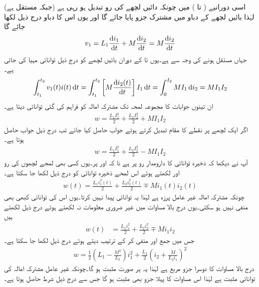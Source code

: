 اسی دورانیے ( تا )  میں چونکہ دائیں لچھے کی رو تبدیل ہو رہی ہے (جبکہ  مستقل ہے) لہٰذا بائیں لچھے کے دباو میں مشترک جزو پایا جائے گا اور یوں اس کا دباو درج ذیل لکھا جائے گا
\begin{align*}
v_1=L_1 \frac{\dif i_1}{\dif t}+M \frac{\dif i_2}{\dif t}=M\frac{\dif i_2}{\dif t}
\end{align*}
جہاں  مستقل ہونے کی وجہ سے  ہے۔یوں  تا  کے دوران بائیں لچھے کو درج ذیل توانائی مہیا کی جاتی ہے۔
\begin{align*}
\int_{t_1}^{t_2} v_1(t) i(t)\dif t=\int_{t_1}^{t_2} \left[M \frac{\dif i_2(t)}{\dif t}\right] I_1 \dif t=\int_{0}^{I_2} M I_1 \dif i_2=M I_1 I_2
\end{align*}
ان تینوں جوابات کا مجموعہ لمحہ  تک مشترکہ امالہ کو فراہم کی گئی توانائی دیتا ہے۔
\begin{align}\label{مساوات_مقناطیسی_توانائی_مشترکہ_امالہ_الف}
w=\frac{L_1 I_1^2}{2}+\frac{L_2 I_2^2}{2}+MI_1 I_2
\end{align}
اگر ایک لچھے پر نقطے کا مقام تبدیل کرتے ہوئے جواب حاصل کیا جائے تب درج ذیل جواب حاصل ہوتا ہے۔
\begin{align}\label{مساوات_مقناطیسی_توانائی_مشترکہ_امالہ_ب}
w=\frac{L_1 I_1^2}{2}+\frac{L_2 I_2^2}{2}-MI_1 I_2
\end{align}
آپ نے دیکھا کہ ذخیرہ توانائی کا دارومدار رو پر ہے نا کہ  اور  پر۔یوں کسی بھی لمحے لچھوں کی رو  اور  لکھتے ہوئے اس لمحے ذخیرہ توانائی کو درج ذیل لکھا جا سکتا ہے۔
\begin{align}\label{مساوات_مقناطیسی_توانائی_مشترکہ_امالہ_پ}
w(t)=\frac{L_1 i^2_1(t)}{2}+\frac{L_2 i^2_2(t)}{2}\mp M i_1(t) i_2(t)
\end{align}
چونکہ مشترکہ امالہ غیر عامل پرزہ ہے لہٰذا یہ توانائی پیدا نہیں کرتا۔یوں اس کی توانائی کبھی بھی منفی نہیں ہو سکتی۔یوں درج بالا مساوات میں غیر ضروری معلومات نہ لکھتے ہوئے درج ذیل لکھتے ہیں
\begin{align}
w(t)&=\frac{L_1 i^2_1}{2}+\frac{L_2 i^2_2}{2}\mp M i_1 i_2
\end{align}
جس میں  جمع اور منفی کر کے ترتیب دیتے ہوئے درج ذیل لکھا جا سکتا ہے۔
\begin{align}
w=\frac{1}{2} \left(L_1-\frac{M^2}{L_2}\right)i^2_1+\frac{L_2}{2}\left(i_2+\frac{M}{L_2 i_1}\right)^2
\end{align}
درج بالا مساوات کا دوسرا جزو مربع ہے لہٰذا یہ ہر صورت مثبت ہو گا۔چونکہ غیر عامل مشترکہ امالہ کی توانائی مثبت ہے لہٰذا اس مساوات کا پہلا جزو بھی مثبت ہو گا جس سے درج ذیل شرط حاصل ہوتا ہے۔
